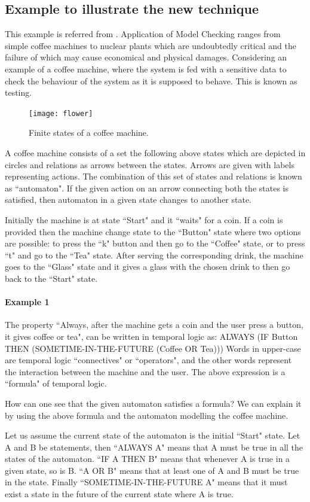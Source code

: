 \documentclass[a4paper,12pt]{report}
\begin{document}
\begin{onehalfspacing}
\section{Example to illustrate the new technique}
\label{Example}
This example is referred from \cite{J.M.Wing1996}.
Application of Model Checking ranges from simple coffee machines to nuclear plants which are undoubtedly critical and the failure of which may cause economical and physical damages. Considering an example of a coffee machine, where the system is fed with a sensitive data to check the behaviour of the system as it is supposed to behave. This is known as testing. 
\begin{figure}[ht!]
\centering
 \texttt{[image: flower]}
\caption{Finite states of a coffee machine.}
\end{figure}
 A coffee machine consists of a set the following above states which are depicted in circles and relations as arrows between the states. Arrows are given with labels representing actions. The combination of this set of states and relations is known as ``automaton". If the given action on an arrow connecting both the states is satisfied, then automaton in a given state changes to another state. 
 
Initially the machine is at state ``Start" and it ``waits" for a coin. If a coin is provided then the machine change state to the ``Button" state where two options are possible: to press the ``k" button and then go to the ``Coffee" state, or to press ``t" and go to the ``Tea" state. After serving the corresponding drink, the machine goes to the ``Glass" state and it gives a glass with the chosen drink to then go back to the ``Start" state.
\paragraph{Example 1}
The property ``Always, after the machine gets a coin and the user press a button, it gives coffee or tea", can be written in temporal logic as:
ALWAYS (IF Button THEN (SOMETIME-IN-THE-FUTURE (Coffee OR Tea)))
Words in upper-case are temporal logic ``connectives" or ``operators", and the other words represent the interaction between the machine and the user. The above expression is a ``formula" of temporal logic.

How can one see that the given automaton satisfies a formula? We can explain it by using the above formula and the automaton modelling the coffee machine.

Let us assume the current state of the automaton is the initial ``Start" state. Let A and B be statements, then ``ALWAYS A" means that A must be true in all the states of the automaton. ``IF A THEN B" means that whenever A is true in a given state, so is B. ``A OR B" means that at least one of A and B must be true in the state. Finally ``SOMETIME-IN-THE-FUTURE A" means that it must exist a state in the future of the current state where A is true.


\end{onehalfspacing}
\end{document}
